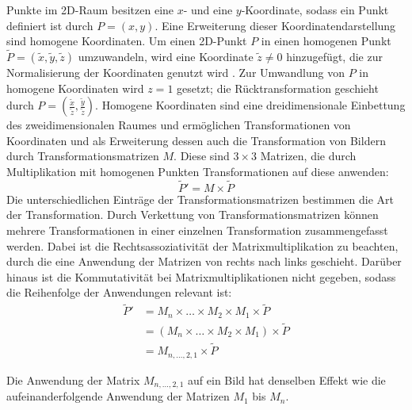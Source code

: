 Punkte im 2D-Raum besitzen eine $x$- und eine $y$-Koordinate, sodass ein Punkt definiert ist durch $P = (x, y)$. Eine Erweiterung dieser Koordinatendarstellung sind homogene Koordinaten. Um einen 2D-Punkt $P$ in einen homogenen Punkt $\widetilde{P} = (\widetilde{x}, \widetilde{y}, \widetilde{z})$ umzuwandeln, wird eine Koordinate $\widetilde{z} \neq 0$ hinzugefügt, die zur Normalisierung der Koordinaten genutzt wird \cite{cv_general}. Zur Umwandlung von $P$ in homogene Koordinaten wird $z=1$ gesetzt; die Rücktransformation geschieht durch $P = (\frac{\widetilde{x}}{\widetilde{z}}, \frac{\widetilde{y}}{\widetilde{z}})$. Homogene Koordinaten sind eine dreidimensionale Einbettung des zweidimensionalen Raumes und ermöglichen Transformationen von Koordinaten und als Erweiterung dessen auch die Transformation von Bildern durch Transformationsmatrizen $M$. Diese sind $3 \times 3$ Matrizen, die durch Multiplikation mit homogenen Punkten Transformationen auf diese anwenden:
\[ \widetilde{P}' = M \times \widetilde{P} \]
Die unterschiedlichen Einträge der Transformationsmatrizen bestimmen die Art der Transformation. Durch Verkettung von Transformationsmatrizen können mehrere Transformationen in einer einzelnen Transformation zusammengefasst werden. Dabei ist die Rechtsassoziativität der Matrixmultiplikation zu beachten, durch die eine Anwendung der Matrizen von rechts nach links geschieht. Darüber hinaus ist die Kommutativität bei Matrixmultiplikationen nicht gegeben, sodass die Reihenfolge der Anwendungen relevant ist:
{%
\begin{align*}
    \widetilde{P}' & = M_n \times \dots \times M_2 \times M_1 \times \widetilde{P}   \\
                   & = (M_n \times \dots \times M_2 \times M_1) \times \widetilde{P} \\
                   & = M_{n, \dots, 2, 1} \times \widetilde{P}
\end{align*}}

Die Anwendung der Matrix $M_{n, \dots, 2, 1}$ auf ein Bild hat denselben Effekt wie die aufeinanderfolgende Anwendung der Matrizen $M_1$ bis $M_n$.

